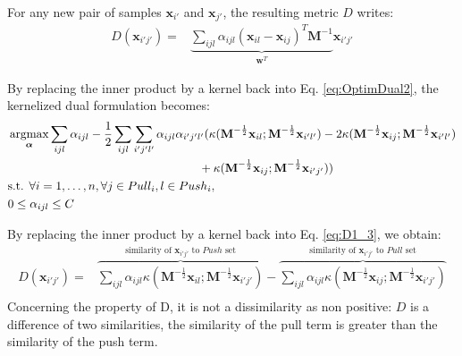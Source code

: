 \noindent For any new pair of samples $\textbf{x}_{i'}$ and $\textbf{x}_{j'}$, the resulting metric $D$ writes: 
\begin{align}
	D(\textbf{x}_{i'j'}) = & 
	\underbrace{
		\sum\limits_{ijl} \alpha_{ijl} 
		(\textbf{x}_{il}-\textbf{x}_{ij})^T
		\textbf{M}^{-1}
	}_{\textbf{w}^T}
	\textbf{x}_{i'j'}
	\label{eq:D1_2}
\end{align}

\noindent By replacing the inner product by a kernel back into Eq. \ref{eq:OptimDual2}, the kernelized dual formulation becomes:
\begin{equation}
\begin{aligned}
&\displaystyle \argmax_{\boldsymbol{\alpha}} 
\sum\limits_{ijl} \alpha_{ijl} 
- \frac{1}{2} 
\sum\limits_{ijl} \sum\limits_{i'j'l'}
\alpha_{ijl} \alpha_{i'j'l'}
( \kappa(\textbf{M}^{-\frac{1}{2}} \textbf{x}_{il} ;  \textbf{M}^{-\frac{1}{2}} \textbf{x}_{i'l'} )
-2\kappa(\textbf{M}^{-\frac{1}{2}} \textbf{x}_{ij} ;  \textbf{M}^{-\frac{1}{2}} \textbf{x}_{i'l'} ) \\
& \qquad \qquad \qquad \qquad \qquad \qquad \qquad \qquad +\kappa(\textbf{M}^{-\frac{1}{2}} \textbf{x}_{ij} ;  \textbf{M}^{-\frac{1}{2}} \textbf{x}_{i'j'} ) 
)   \\
&\text{s.t.  } \forall i = 1, \ldots, n, \forall j \in Pull_i, l \in Push_i, \\
& 0 \leq \alpha_{ijl} \leq C
\end{aligned}
\label{eq:OptimDual3}
\end{equation}

\noindent By replacing the inner product by a kernel back into Eq. \ref{eq:D1_3}, we obtain:
\begin{equation}
\begin{aligned}
D(\textbf{x}_{i'j'}) = & 
\overbrace{
	\sum\limits_{ijl} \alpha_{ijl} 
	\kappa(\textbf{M}^{-\frac{1}{2}}\textbf{x}_{il}; \textbf{M}^{-\frac{1}{2}} \textbf{x}_{i'j'})
}^{\text{similarity of $\textbf{x}_{i'j'}$ to $Push$ set}}		
- 
\overbrace{	
	\sum\limits_{ijl} \alpha_{ijl} 
	\kappa(\textbf{M}^{-\frac{1}{2}}\textbf{x}_{ij}; \textbf{M}^{-\frac{1}{2}} \textbf{x}_{i'j'})
}^{\text{similarity of $\textbf{x}_{i'j'}$ to $Pull$ set}}		\\	
\end{aligned} 
\label{Eq:nonlinearD2}
\end{equation}
Concerning the property of  D, it is not a dissimilarity as non positive: $D$ is a difference of two similarities, the similarity of the pull term is greater than the similarity of the push term.

